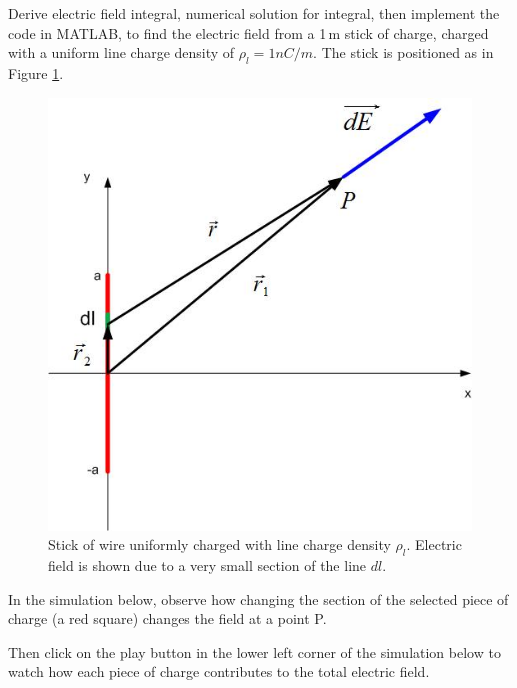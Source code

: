 \documentclass{ximera}
\begin{document}
\begin{problem} Derive electric field integral,  numerical solution for integral, then implement the code in MATLAB, to find the electric field from a 1\,m stick of charge, charged with a uniform line charge density of $\rho_l=1nC/m$. The stick is positioned as in Figure \ref{stickf}.

\begin{figure}[!ht]
\begin{center}
\includegraphics[scale=0.5]{../jpg/stickf.jpg}
\caption{\label{stickf} Stick of wire uniformly charged with line charge density $\rho_l$. Electric field is shown due to a very small section of the line $dl$.}
\end{center}
\end{figure}

In the simulation below, observe how changing the section of the selected piece of charge (a red square) changes the field at a point P.

\begin{center}  
\end{center} 

Then click on the play button in the lower left corner of the simulation below to watch how each piece of charge contributes to the total electric field.


\begin{center}  
\end{center} 

\end{problem}
\end{document}
